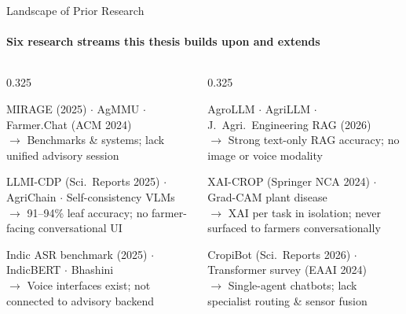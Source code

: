 \documentclass[aspectratio=169, 10pt]{beamer}
\begin{document}
\begin{frame}{Landscape of Prior Research}
  \framesubtitle{Six research streams this thesis builds upon and extends}

  \begin{columns}[T]
    \begin{column}{0.325\textwidth}
      \begin{tcolorbox}[agricard=Purple, title=S1 · Multimodal conversational AI, before skip=0pt, after skip=4pt]
        \tiny MIRAGE (2025) $\cdot$ AgMMU $\cdot$ Farmer.Chat (ACM 2024)\\
        $\rightarrow$ Benchmarks \& systems; lack unified advisory session
      \end{tcolorbox}
      \begin{tcolorbox}[agricard=Coral, title=S3 · VLMs for plant disease, before skip=0pt, after skip=4pt]
        \tiny LLMI-CDP (Sci.\ Reports 2025) $\cdot$ AgriChain $\cdot$ Self-consistency VLMs\\
        $\rightarrow$ 91--94\% leaf accuracy; no farmer-facing conversational UI
      \end{tcolorbox}
      \begin{tcolorbox}[agricard=Blue, title=S5 · Speech \& multilingual NLP, before skip=0pt]
        \tiny Indic ASR benchmark (2025) $\cdot$ IndicBERT $\cdot$ Bhashini\\
        $\rightarrow$ Voice interfaces exist; not connected to advisory backend
      \end{tcolorbox}
    \end{column}

    \begin{column}{0.325\textwidth}
      \begin{tcolorbox}[agricard=Teal, title=S2 · LLMs \& RAG for farm advisory, before skip=0pt, after skip=4pt]
        \tiny AgroLLM $\cdot$ AgriLLM $\cdot$ J.\ Agri.\ Engineering RAG (2026)\\
        $\rightarrow$ Strong text-only RAG accuracy; no image or voice modality
      \end{tcolorbox}
      \begin{tcolorbox}[agricard=Amber, title=S4 · Explainable AI in agriculture, before skip=0pt, after skip=4pt]
        \tiny XAI-CROP (Springer NCA 2024) $\cdot$ Grad-CAM plant disease\\
        $\rightarrow$ XAI per task in isolation; never surfaced to farmers conversationally
      \end{tcolorbox}
      \begin{tcolorbox}[agricard=Green, title=S6 · Agentic \& expert systems, before skip=0pt]
        \tiny CropiBot (Sci.\ Reports 2026) $\cdot$ Transformer survey (EAAI 2024)\\
        $\rightarrow$ Single-agent chatbots; lack specialist routing \& sensor fusion
      \end{tcolorbox}
    \end{column}


\end{columns}
\end{frame}
\end{document}
